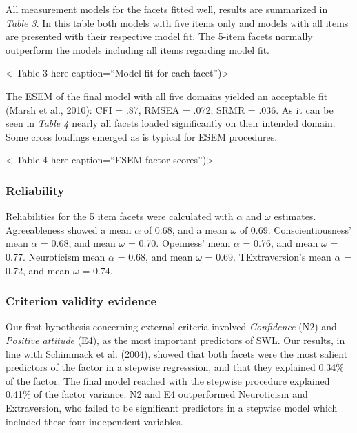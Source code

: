 \documentclass[,man,floatsintext]{apa6}
\begin{document}
All measurement models for the facets fitted well, results are
summarized in \emph{Table 3}. In this table both models with five items
only and models with all items are presented with their respective model
fit. The 5-item facets normally outperform the models including all
items regarding model fit.

\vspace{5mm}

\textless{} Table 3 here caption=\enquote{Model fit for each
facet})\textgreater{}

\vspace{5mm}

The ESEM of the final model with all five domains yielded an acceptable
fit (Marsh et al., 2010): CFI = .87, RMSEA = .072, SRMR = .036. As it
can be seen in \emph{Table 4} nearly all facets loaded significantly on
their intended domain. Some cross loadings emerged as is typical for
ESEM procedures.

\vspace{5mm}

\textless{} Table 4 here caption=\enquote{ESEM factor
scores})\textgreater{}

\vspace{5mm}

\subsubsection{Reliability}\label{reliability-1}

Reliabilities for the 5 item facets were calculated with \(\alpha\) and
\(\omega\) estimates. Agreeableness showed a mean \(\alpha\) of 0.68,
and a mean \(\omega\) of 0.69. Conscientiousness' mean \(\alpha\) =
0.68, and mean \(\omega\) = 0.70. Openness' mean \(\alpha\) = 0.76, and
mean \(\omega\) = 0.77. Neuroticism mean \(\alpha\) = 0.68, and mean
\(\omega\) = 0.69. TExtraversion's mean \(\alpha\) = 0.72, and mean
\(\omega\) = 0.74.

\subsubsection{Criterion validity
evidence}\label{criterion-validity-evidence-1}

Our first hypothesis concerning external criteria involved
\emph{Confidence} (N2) and \emph{Positive attitude} (E4), as the most
important predictors of SWL. Our results, in line with Schimmack et al.
(2004), showed that both facets were the most salient predictors of the
factor in a stepwise regresssion, and that they explained 0.34\% of the
factor. The final model reached with the stepwise procedure explained
0.41\% of the factor variance. N2 and E4 outperformed Neuroticism and
Extraversion, who failed to be significant predictors in a stepwise
model which included these four independent variables.
\end{document}
